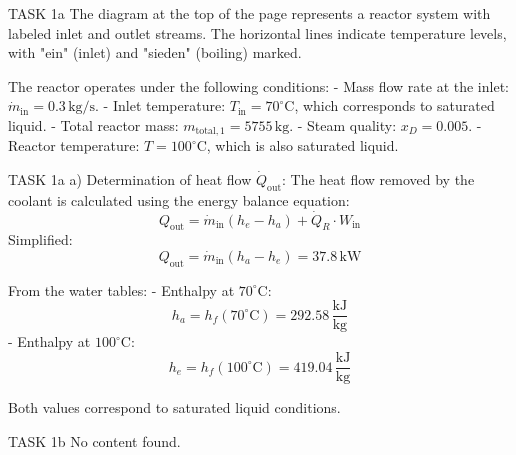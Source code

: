TASK 1a  
The diagram at the top of the page represents a reactor system with labeled inlet and outlet streams. The horizontal lines indicate temperature levels, with "ein" (inlet) and "sieden" (boiling) marked.  

The reactor operates under the following conditions:  
- Mass flow rate at the inlet: \( \dot{m}_{\text{in}} = 0.3 \, \text{kg/s} \).  
- Inlet temperature: \( T_{\text{in}} = 70^\circ\text{C} \), which corresponds to saturated liquid.  
- Total reactor mass: \( m_{\text{total},1} = 5755 \, \text{kg} \).  
- Steam quality: \( x_D = 0.005 \).  
- Reactor temperature: \( T = 100^\circ\text{C} \), which is also saturated liquid.  

TASK 1a  
a) Determination of heat flow \( \dot{Q}_{\text{out}} \):  
The heat flow removed by the coolant is calculated using the energy balance equation:  
\[
Q_{\text{out}} = \dot{m}_{\text{in}} (h_e - h_a) + \dot{Q}_R \cdot W_{\text{in}}
\]  
Simplified:  
\[
Q_{\text{out}} = \dot{m}_{\text{in}} (h_a - h_e) = 37.8 \, \text{kW}
\]  

From the water tables:  
- Enthalpy at \( 70^\circ\text{C} \):  
\[
h_a = h_f(70^\circ\text{C}) = 292.58 \, \frac{\text{kJ}}{\text{kg}}
\]  
- Enthalpy at \( 100^\circ\text{C} \):  
\[
h_e = h_f(100^\circ\text{C}) = 419.04 \, \frac{\text{kJ}}{\text{kg}}
\]  

Both values correspond to saturated liquid conditions.  

TASK 1b  
No content found.